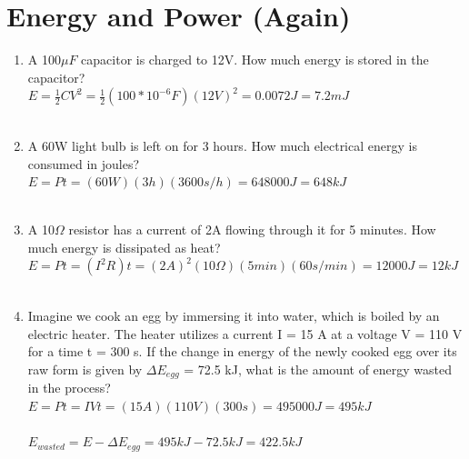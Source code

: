 \documentclass{article}
\begin{document}
\section*{Energy and Power (Again)}
\begin{enumerate}
    \item A 100$\mu F$ capacitor is charged to 12V. How much energy is stored in the capacitor?\\
    \textbf{$E = \frac{1}{2}CV^{2} = \frac{1}{2}(100*10^{-6} F)(12 V)^{2} = 0.0072 J = 7.2 mJ$}\\\\
    \item A 60W light bulb is left on for 3 hours. How much electrical energy is consumed in joules?\\
    \textbf{$E = Pt = (60 W)(3 h)(3600 s/h) = 648000 J = 648 kJ$}\\\\
    \item A 10$\Omega$ resistor has a current of 2A flowing through it for 5 minutes. How much energy is dissipated as heat?\\
    \textbf{$E = Pt = (I^{2}R)t = (2 A)^{2}(10 \Omega)(5 min)(60 s/min) = 12000 J = 12 kJ$}\\\\
    \item Imagine we cook an egg by immersing it into water, which is boiled by an electric heater. The heater utilizes a current I = 15 A at a voltage V = 110 V for a time t = 300 s. If the change in energy of the newly cooked egg over its raw form is given by $\Delta E_{egg}$ = 72.5 kJ, what is the amount of energy wasted in the process? \\
    \textbf{$E = Pt = IVt = (15 A)(110 V)(300 s) = 495000 J = 495 kJ$}\\\\
    \textbf{$E_{wasted} = E - \Delta E_{egg} = 495 kJ - 72.5 kJ = 422.5 kJ$}
\end{enumerate}
\end{document}
